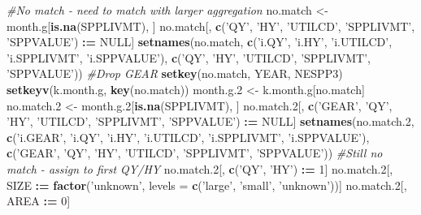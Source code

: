 \documentclass[]{article}
\newenvironment{Shaded}{\begin{snugshade}}{\end{snugshade}}
\newcommand{\KeywordTok}[1]{\textcolor[rgb]{0.13,0.29,0.53}{\textbf{#1}}}
\newcommand{\DataTypeTok}[1]{\textcolor[rgb]{0.13,0.29,0.53}{#1}}
\newcommand{\DecValTok}[1]{\textcolor[rgb]{0.00,0.00,0.81}{#1}}
\newcommand{\StringTok}[1]{\textcolor[rgb]{0.31,0.60,0.02}{#1}}
\newcommand{\CommentTok}[1]{\textcolor[rgb]{0.56,0.35,0.01}{\textit{#1}}}
\newcommand{\OtherTok}[1]{\textcolor[rgb]{0.56,0.35,0.01}{#1}}
\newcommand{\OperatorTok}[1]{\textcolor[rgb]{0.81,0.36,0.00}{\textbf{#1}}}
\newcommand{\ErrorTok}[1]{\textcolor[rgb]{0.64,0.00,0.00}{\textbf{#1}}}
\newcommand{\NormalTok}[1]{#1}
\begin{document}
\begin{Shaded}
\begin{Highlighting}[]
  \CommentTok{#No match - need to match with larger aggregation}
\NormalTok{  no.match  <-}\StringTok{ }\NormalTok{month.g[}\KeywordTok{is.na}\NormalTok{(SPPLIVMT), ]}
\NormalTok{  no.match[, }\KeywordTok{c}\NormalTok{(}\StringTok{'QY'}\NormalTok{, }\StringTok{'HY'}\NormalTok{, }\StringTok{'UTILCD'}\NormalTok{, }\StringTok{'SPPLIVMT'}\NormalTok{, }\StringTok{'SPPVALUE'}\NormalTok{) }\OperatorTok{:}\ErrorTok{=}\StringTok{ }\OtherTok{NULL}\NormalTok{]}
  \KeywordTok{setnames}\NormalTok{(no.match, }\KeywordTok{c}\NormalTok{(}\StringTok{'i.QY'}\NormalTok{, }\StringTok{'i.HY'}\NormalTok{, }\StringTok{'i.UTILCD'}\NormalTok{, }\StringTok{'i.SPPLIVMT'}\NormalTok{, }\StringTok{'i.SPPVALUE'}\NormalTok{), }
           \KeywordTok{c}\NormalTok{(}\StringTok{'QY'}\NormalTok{, }\StringTok{'HY'}\NormalTok{, }\StringTok{'UTILCD'}\NormalTok{, }\StringTok{'SPPLIVMT'}\NormalTok{, }\StringTok{'SPPVALUE'}\NormalTok{))}
  \CommentTok{#Drop GEAR}
  \KeywordTok{setkey}\NormalTok{(no.match, YEAR, NESPP3)}
  \KeywordTok{setkeyv}\NormalTok{(k.month.g, }\KeywordTok{key}\NormalTok{(no.match))}
\NormalTok{  month.g.}\DecValTok{2}\NormalTok{ <-}\StringTok{ }\NormalTok{k.month.g[no.match]}
\NormalTok{  no.match.}\DecValTok{2}\NormalTok{ <-}\StringTok{ }\NormalTok{month.g.}\DecValTok{2}\NormalTok{[}\KeywordTok{is.na}\NormalTok{(SPPLIVMT), ]}
\NormalTok{  no.match.}\DecValTok{2}\NormalTok{[, }\KeywordTok{c}\NormalTok{(}\StringTok{'GEAR'}\NormalTok{, }\StringTok{'QY'}\NormalTok{, }\StringTok{'HY'}\NormalTok{, }\StringTok{'UTILCD'}\NormalTok{, }\StringTok{'SPPLIVMT'}\NormalTok{, }\StringTok{'SPPVALUE'}\NormalTok{) }\OperatorTok{:}\ErrorTok{=}\StringTok{ }\OtherTok{NULL}\NormalTok{]}
  \KeywordTok{setnames}\NormalTok{(no.match.}\DecValTok{2}\NormalTok{, }\KeywordTok{c}\NormalTok{(}\StringTok{'i.GEAR'}\NormalTok{, }\StringTok{'i.QY'}\NormalTok{, }\StringTok{'i.HY'}\NormalTok{, }\StringTok{'i.UTILCD'}\NormalTok{, }\StringTok{'i.SPPLIVMT'}\NormalTok{, }\StringTok{'i.SPPVALUE'}\NormalTok{), }
           \KeywordTok{c}\NormalTok{(}\StringTok{'GEAR'}\NormalTok{, }\StringTok{'QY'}\NormalTok{, }\StringTok{'HY'}\NormalTok{, }\StringTok{'UTILCD'}\NormalTok{, }\StringTok{'SPPLIVMT'}\NormalTok{, }\StringTok{'SPPVALUE'}\NormalTok{))}
  \CommentTok{#Still no match - assign to first QY/HY}
\NormalTok{  no.match.}\DecValTok{2}\NormalTok{[, }\KeywordTok{c}\NormalTok{(}\StringTok{'QY'}\NormalTok{, }\StringTok{'HY'}\NormalTok{) }\OperatorTok{:}\ErrorTok{=}\StringTok{ }\DecValTok{1}\NormalTok{]}
\NormalTok{  no.match.}\DecValTok{2}\NormalTok{[, SIZE }\OperatorTok{:}\ErrorTok{=}\StringTok{ }\KeywordTok{factor}\NormalTok{(}\StringTok{'unknown'}\NormalTok{, }\DataTypeTok{levels =} \KeywordTok{c}\NormalTok{(}\StringTok{'large'}\NormalTok{, }\StringTok{'small'}\NormalTok{, }\StringTok{'unknown'}\NormalTok{))]}
\NormalTok{  no.match.}\DecValTok{2}\NormalTok{[, AREA }\OperatorTok{:}\ErrorTok{=}\StringTok{ }\DecValTok{0}\NormalTok{]}
  

\end{Highlighting}
\end{Shaded}
\end{document}
